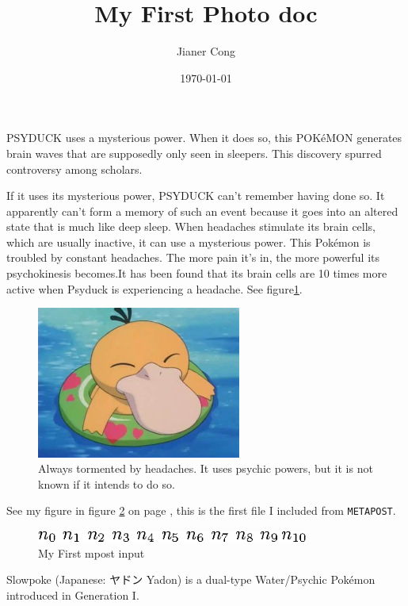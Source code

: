 \documentclass{article}
\title{My First Photo doc}
\author{Jianer Cong}
\date{\today}
\begin{document}
\maketitle
\listoffigures
\newpage{}

PSYDUCK uses a mysterious power. When it does so, this POKéMON generates brain
waves that are supposedly only seen in sleepers. This discovery spurred
controversy among scholars.

If it uses its mysterious power, PSYDUCK can’t remember having done so. It
apparently can’t form a memory of such an event because it goes into an altered
state that is much like deep sleep. When headaches stimulate its brain cells,
which are usually inactive, it can use a mysterious power. This Pokémon is
troubled by constant headaches. The more pain it’s in, the more powerful its
psychokinesis becomes.It has been found that its brain cells are 10 times more
active when Psyduck is experiencing a headache. See figure\ref{fig:psy}.

\begin{figure}
  \includegraphics[width=0.6\textwidth]{psyduck.jpeg}
  \caption{Always tormented by headaches. It uses psychic powers, but it is not
    known if it intends to do so.}\label{fig:psy}
\end{figure}

See my figure in figure \ref{fig:n} on page \pageref{fig:n}, this is the first
file I included from \verb|METAPOST|.

\begin{figure}[ht]
  \centering
  \includegraphics[width=0.8\textwidth]{n-latex-labs.eps}
  \caption{My First mpost input}\label{fig:n}
\end{figure}

\newpage{}
Slowpoke (Japanese: ヤドン Yadon) is a dual-type Water/Psychic Pokémon
introduced in Generation I.
\end{document}
